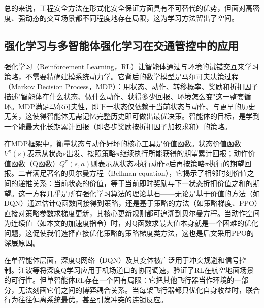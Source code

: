 \documentclass[12pt,a4paper,UTF8]{ctexart}
\begin{document}
总的来说，工程安全方法在形式化安全保证方面具有不可替代的优势，但面对高密度、强动态的交互场景都不同程度地存在局限，这为学习方法留出了空间。

\subsection{强化学习与多智能体强化学习在交通管控中的应用}

强化学习（Reinforcement Learning，RL）让智能体通过与环境的试错交互来学习策略，不需要精确建模系统动力学。它背后的数学模型是马尔可夫决策过程（Markov Decision Process，MDP）：用状态、动作、转移概率、奖励和折扣因子描述"智能体在什么状态、做什么动作、获得多少回报、环境怎么变"这一整套循环。MDP满足马尔可夫性，即下一状态仅依赖于当前状态与动作、与更早的历史无关，这使得智能体无需记忆完整历史即可做出最优决策。智能体的目标，是学到一个能最大化长期累计回报（即各步奖励按折扣因子加权求和）的策略。

在MDP框架中，衡量状态与动作好坏的核心工具是价值函数。状态价值函数$V^\pi(s)$表示从状态$s$出发、按照策略$\pi$继续执行所能获得的期望累计回报；动作价值函数（Q函数）$Q^\pi(s,a)$则表示从状态$s$执行动作$a$后再按策略$\pi$执行的期望回报。二者满足著名的贝尔曼方程（Bellman equation），它揭示了相邻时刻价值之间的递推关系：当前状态的价值，等于当前即时奖励与下一状态折扣价值之和的期望。这一方程几乎是所有强化学习算法的理论基石——无论是基于价值的方法（如DQN）通过估计Q函数间接得到策略，还是基于策略的方法（如策略梯度、PPO）直接对策略参数求梯度更新，其核心更新规则都可追溯到贝尔曼方程。当动作空间为连续值（如本文的加速度指令）时，对Q函数求最大值本身就是一个困难的优化问题，这促使我们选择直接优化策略的策略梯度类方法，这也是后文采用PPO的深层原因。

在单智能体层面，深度Q网络（DQN）\cite{ref40}及其变体被广泛用于冲突规避和信号控制\cite{ref12,ref15,ref16,ref17,ref18,ref19,ref20,ref21,ref22}。江波等\cite{ref21}将深度Q学习应用于机场道口的协同调速，验证了RL在航空地面场景的可行性。但单智能体RL存在一个固有局限：它把其他飞行器当作环境的一部分，无法刻画它们之间的博弈耦合关系。当每架飞行器都只优化自身收益时，联合行为往往偏离系统最优，甚至引发冲突的连锁反应。
\end{document}
